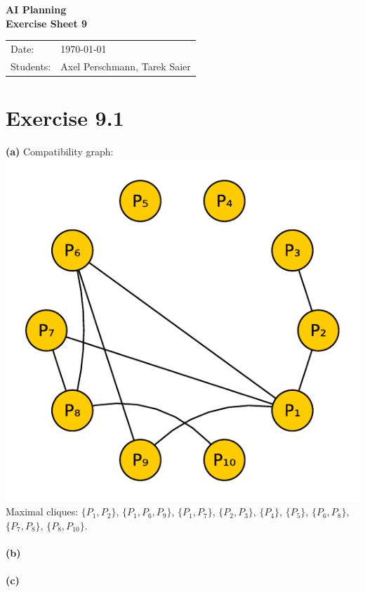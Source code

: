 \documentclass[11pt,a4paper]{article}
\newcommand{\sheetNr}{9}
\begin{document}
\begin{center}
\Huge{\textbf{AI Planning}}\\
\LARGE{\textbf{Exercise Sheet \sheetNr}}
\end{center}
\vspace{2cm}
\begin{tabular}{ll}
Date: & \today\\
Students: & Axel Perschmann, Tarek Saier
\end{tabular}

\section*{Exercise 9.1}
\textbf{(a)} Compatibility graph:\\
\includegraphics[scale=0.7]{compgraph}\\
Maximal cliques: $\{P_1,P_2\}$, $\{P_1,P_6,P_9\}$, $\{P_1,P_7\}$, $\{P_2,P_3\}$, $\{P_4\}$, $\{P_5\}$, $\{P_6,P_8\}$, $\{P_7,P_8\}$, $\{P_8,P_{10}\}$.\\
\\
\textbf{(b)}\\
\\
\textbf{(c)}\\

\label{lastpage}
\end{document}
